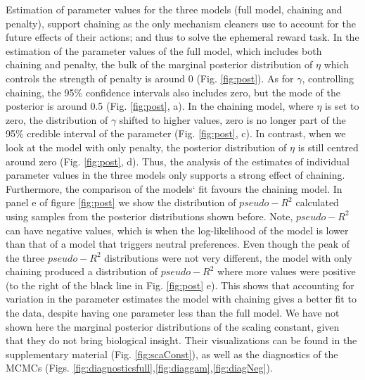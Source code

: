 \documentclass[
  12pt,
]{article}
\begin{document}
Estimation of parameter values for the three models (full model,
chaining and penalty), support chaining as the only mechanism cleaners
use to account for the future effects of their actions; and thus to
solve the ephemeral reward task. In the estimation of the parameter
values of the full model, which includes both chaining and penalty, the
bulk of the marginal posterior distribution of \(\eta\) which controls
the strength of penalty is around 0 (Fig. \ref{fig:post}). As for
\(\gamma\), controlling chaining, the 95\% confidence intervals also
includes zero, but the mode of the posterior is around 0.5 (Fig.
\ref{fig:post}, a). In the chaining model, where \(\eta\) is set to
zero, the distribution of \(\gamma\) shifted to higher values, zero is
no longer part of the 95\% credible interval of the parameter (Fig.
\ref{fig:post}, c). In contrast, when we look at the model with only
penalty, the posterior distribution of \(\eta\) is still centred around
zero (Fig. \ref{fig:post}, d). Thus, the analysis of the estimates of
individual parameter values in the three models only supports a strong
effect of chaining. Furthermore, the comparison of the models` fit
favours the chaining model. In panel e of figure \ref{fig:post} we show
the distribution of \(pseudo-R^2\) calculated using samples from the
posterior distributions shown before. Note, \(pseudo-R^2\) can have
negative values, which is when the log-likelihood of the model is lower
than that of a model that triggers neutral preferences. Even though the
peak of the three \(pseudo-R^2\) distributions were not very different,
the model with only chaining produced a distribution of \(pseudo-R^2\)
where more values were positive (to the right of the black line in Fig.
\ref{fig:post} e). This shows that accounting for variation in the
parameter estimates the model with chaining gives a better fit to the
data, despite having one parameter less than the full model. We have not
shown here the marginal posterior distributions of the scaling constant,
given that they do not bring biological insight. Their visualizations
can be found in the supplementary material (Fig. \ref{fig:scaConst}), as
well as the diagnostics of the MCMCs (Figs.
\ref{fig:diagnosticsfull},\ref{fig:diaggam},\ref{fig:diagNeg}).
\end{document}
